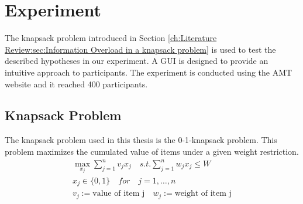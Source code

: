 
\chapter{Experiment}
\label{ch:Experiment}

The knapsack problem introduced in Section \ref{ch:Literature Review:sec:Information Overload in a knapsack problem} is used to test the described hypotheses in our experiment. A \ac{GUI} is designed to provide an intuitive approach to participants. The experiment is conducted using the \ac{AMT} website and it reached 400 participants.

\section{Knapsack Problem}
\label{ch:Experiment:sec:Knapsack}

The knapsack problem used in this thesis is the 0-1-knapsack problem. This problem maximizes the cumulated value of items under a given weight restriction.
\begin{equation}
\begin{split}
\max\limits_{x_j} \sum_{j=1}^{n} v_j x_j \quad
s.t. \sum_{j=1}^{n} w_j x_j \leq W \quad \\
x_j \in \{0,1\} \quad for \quad j = 1, \dots, n \\
v_j := \text{value of item j} \quad w_j := \text{weight of item j}
\end{split}
\end{equation}

